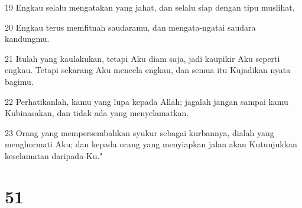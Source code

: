 \par 19 Engkau selalu mengatakan yang jahat, dan selalu siap dengan tipu muslihat.
\par 20 Engkau terus memfitnah saudaramu, dan mengata-ngatai saudara kandungmu.
\par 21 Itulah yang kaulakukan, tetapi Aku diam saja, jadi kaupikir Aku seperti engkau. Tetapi sekarang Aku mencela engkau, dan semua itu Kujadikan nyata bagimu.
\par 22 Perhatikanlah, kamu yang lupa kepada Allah; jagalah jangan sampai kamu Kubinasakan, dan tidak ada yang menyelamatkan.
\par 23 Orang yang mempersembahkan syukur sebagai kurbannya, dialah yang menghormati Aku; dan kepada orang yang menyiapkan jalan akan Kutunjukkan keselamatan daripada-Ku."

\chapter{51}

